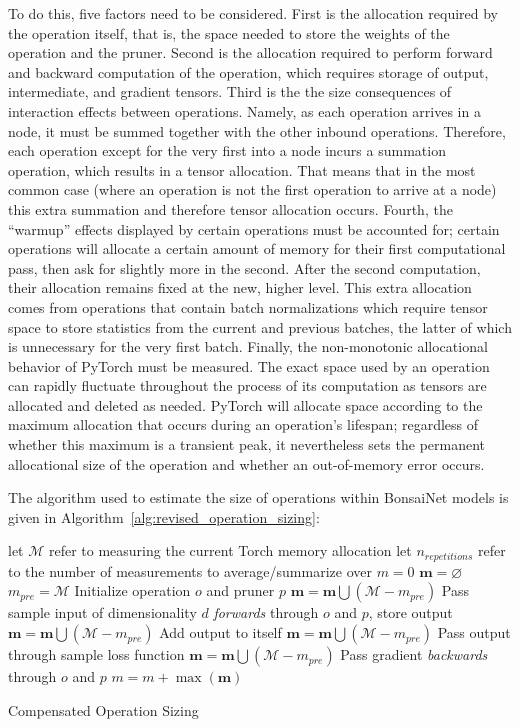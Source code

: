 To do this, five factors need to be considered. First is the allocation required by the operation itself, that is, the space
needed to store the weights of the operation and the pruner. Second is the allocation required to perform forward and
backward computation of the operation, which requires storage of output, intermediate, and gradient tensors. Third is
the the size consequences of interaction effects between operations. Namely, as each
operation arrives in a node, it must be summed together with the other inbound operations. Therefore, each operation
except for the very first into a node incurs a summation operation, which results in a tensor allocation. That means that in the most
common case (where an operation is not the first operation to arrive at a node) this extra summation and therefore
tensor allocation occurs. Fourth, the ``warmup'' effects displayed by certain operations must be accounted for; certain
operations will allocate a certain amount of memory for their first computational pass, then ask for slightly more in the
second. After the second computation, their allocation remains fixed at the new, higher level. This extra allocation
comes from operations that contain batch normalizations which require tensor space to store
statistics from the current and previous batches, the latter of which is unnecessary for the very first batch. Finally,
the non-monotonic allocational behavior of PyTorch must be measured. The exact space used by an operation can rapidly
fluctuate throughout the process of its computation as tensors are allocated and deleted as needed. PyTorch will allocate space
according to the maximum allocation that occurs during an operation's lifespan;
regardless of whether this maximum is a transient peak, it nevertheless sets the permanent allocational size of the
operation and whether an out-of-memory error occurs.

The algorithm used to
estimate the size of operations within BonsaiNet models is given in Algorithm~\ref{alg:revised_operation_sizing}:
\begin{algorithm}
	\nl let $\mathcal{M}$ refer to measuring the current Torch memory allocation\;
	\nl let $n_{repetitions}$ refer to the number of measurements to average/summarize over\;
	\nl $m = 0$\;
	 {
		\nl $\mathbf{m} = \varnothing$\;
		 $m_{pre} = \mathcal{M}$\;
		 Initialize operation $o$ and pruner $p$\;
		 {
			 $\mathbf{m} = \mathbf{m} \bigcup (\mathcal{M} - m_{pre})$\;
			 Pass sample input of dimensionality $d$ \textit{forwards} through $o$ and $p$, store output\;
			  $\mathbf{m} = \mathbf{m} \bigcup (\mathcal{M} - m_{pre})$\;
			 Add output to itself\;
			 $\mathbf{m} = \mathbf{m} \bigcup (\mathcal{M} - m_{pre})$\;
			 Pass output through sample loss function\;
			  $\mathbf{m} = \mathbf{m} \bigcup (\mathcal{M} - m_{pre})$\;
			 Pass gradient \textit{backwards} through $o$ and $p$\;
		}
		 $m = m + \max(\mathbf{m})$
	}
	\caption{Compensated Operation Sizing}
	\label{alg:revised_operation_sizing}
\end{algorithm}

